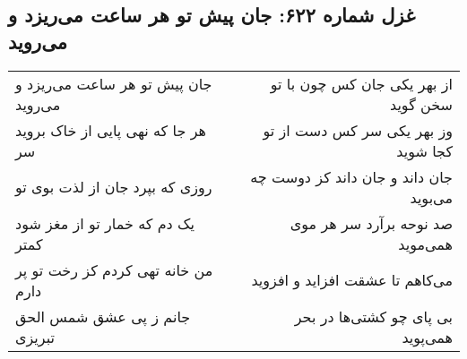 \begin{center}
\section*{غزل شماره ۶۲۲: جان پیش تو هر ساعت می‌ریزد و می‌روید}
\label{sec:0622}
\begin{longtable}{l p{0.5cm} r}
جان پیش تو هر ساعت می‌ریزد و می‌روید
&&
از بهر یکی جان کس چون با تو سخن گوید
\\
هر جا که نهی پایی از خاک بروید سر
&&
وز بهر یکی سر کس دست از تو کجا شوید
\\
روزی که بپرد جان از لذت بوی تو
&&
جان داند و جان داند کز دوست چه می‌بوید
\\
یک دم که خمار تو از مغز شود کمتر
&&
صد نوحه برآرد سر هر موی همی‌موید
\\
من خانه تهی کردم کز رخت تو پر دارم
&&
می‌کاهم تا عشقت افزاید و افزوید
\\
جانم ز پی عشق شمس الحق تبریزی
&&
بی پای چو کشتی‌ها در بحر همی‌پوید
\\
\end{longtable}
\end{center}
